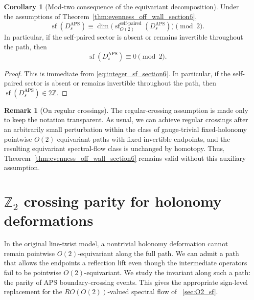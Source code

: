 \documentclass[11pt]{article}
\theoremstyle{definition}
\newtheorem{corollary}[theorem]{Corollary}
\newtheorem{remark}[remark]{Remark}
\DeclareMathOperator{\APS}{APS}
\numberwithin{equation}{section}
\begin{document}
\begin{corollary}[Mod-two consequence of the equivariant decomposition]
\label{cor:Z2_from_O2_sf}
Under the assumptions of Theorem~\ref{thm:evenness_off_wall_section6},
\begin{equation}\label{eq:Z2_from_RO_section6}
\operatorname{sf}(D_s^{\APS})
\equiv
\dim\!\bigl(\operatorname{sf}_{O(2)}^{\text{self-paired}}(D_s^{\APS})\bigr)
\pmod 2.
\end{equation}
In particular, if the self-paired sector is absent or remains invertible throughout the path, then
\begin{equation}\label{eq:integer_sf_even_section6}
\operatorname{sf}(D_s^{\APS})\equiv 0\pmod 2.
\end{equation}
\end{corollary}

\begin{proof}
This is immediate from \eqref{eq:integer_sf_section6}. In particular, if the self-paired sector is absent or remains invertible throughout the path,
then \(\operatorname{sf}(D_s^{\APS})\in 2\mathbb Z\).
\end{proof}


\begin{remark}[On regular crossings]
\label{rem:regular_crossings_section6}
The regular-crossing assumption is made only to keep the notation transparent. As usual, we can achieve regular crossings after an arbitrarily small perturbation within the class of gauge-trivial fixed-holonomy pointwise \(O(2)\)-equivariant paths with fixed invertible endpoints, and the resulting equivariant spectral-flow class is unchanged by homotopy. Thus, Theorem~\ref{thm:evenness_off_wall_section6} remains valid without this auxiliary assumption.

\end{remark}














\section{\texorpdfstring{$\mathbb Z_2$}{Z2} crossing parity for holonomy deformations}
\label{sec:Z2_flow_1}
In the original line-twist model, a nontrivial holonomy deformation cannot remain pointwise \(O(2)\)-equivariant along the full path. We can admit a path that allows the endpoints a reflection lift even though the intermediate operators fail to be pointwise \(O(2)\)-equivariant. We study the invariant along such a path: the parity of APS boundary-crossing events. This gives the appropriate sign-level replacement for the \(RO(O(2))\)-valued spectral flow of~ \autoref{sec:O2_sf}.
\end{document}
